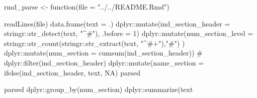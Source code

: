 \begin{Schunk}
\begin{Sinput}
rmd_parse <- function(file = "../../README.Rmd"){
  
  readLines(file) %
    data.frame(text = .) %
    dplyr::mutate(ind_section_header = stringr::str_detect(text, "^#"), .before = 1) %
    dplyr::mutate(num_section_level = stringr::str_count(stringr::str_extract(text, "^#+"),"#") ) %
    dplyr::mutate(num_section = cumsum(ind_section_header)) %
    # dplyr::filter(ind_section_header) %
    dplyr::mutate(name_section = ifelse(ind_section_header, text, NA) %
  parsed
  
  parsed %
    dplyr::group_by(num_section) %
    dplyr::summarize(text %
    
  
}
\end{Sinput}
\end{Schunk}



\address{%
Evangeline Reynolds\\
Affiliation\\%
line 1\\ line 2\\
%
\url{https://journal.r-project.org}\\%
\textit{ORCiD: \href{https://orcid.org/0000-0002-9079-593X}{0000-0002-9079-593X}}\\%
\href{mailto:author1@work}{\nolinkurl{author1@work}}%
}

